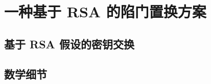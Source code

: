\section{一种基于 RSA 的陷门置换方案}\label{sec:10-3}

\begin{theorem}\label{theo:10-1}
	
\end{theorem}

\begin{game}[RSA]\label{game:10-3}
	
\end{game}

\begin{definition}[RSA 假设]\label{def:10-5}
	
\end{definition}

\subsection{基于 RSA 假设的密钥交换}\label{subsec:10-3-1}

\subsection{数学细节}\label{subsec:10-3-2}